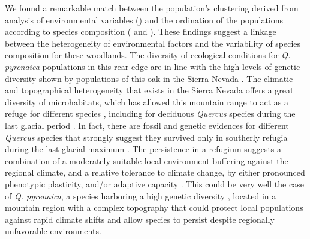 We found a remarkable match between the population's clustering derived from analysis of environmental variables () and the ordination of the populations according to species composition ( and ). These findings suggest a linkage between the heterogeneity of environmental factors and the variability of species composition for these woodlands. The diversity of ecological conditions for \emph{Q. pyrenaica} populations in this rear edge are in line with the high levels of genetic diversity shown by populations of this oak in the Sierra Nevada \autocite{ValbuenaCarabanaGil2013GeneticResilience,ValbuenaCarabanaGil2017CentenaryCoppicing}. The climatic and topographical heterogeneity that exists in the Sierra Nevada offers a great diversity of microhabitats, which has allowed this mountain range to act as a refuge for different species \autocite{MedailDiadema2009GlacialRefugia,GomezLunt2007RefugiaRefugia,BlancoPastoretal2019TopographyExplains}, including for deciduous \emph{Quercus} species during the last glacial period \autocite{Breweretal2002SpreadDeciduous,Olaldeetal2002WhiteOaks,RodriguezSanchezetal2010TreeRange}. In fact, there are fossil and genetic evidences for different \emph{Quercus} species that strongly suggest they survived only in southerly refugia during the last glacial maximum \autocite{Breweretal2002SpreadDeciduous,Petitetal2002IdentificationRefugia,BhagwatWillis2008SpeciesPersistence,BirksWillis2008AlpinesTrees}. The persistence in a refugium suggests a combination of a moderately suitable local environment buffering against the regional climate, and a relative tolerance to climate change, by either pronounced phenotypic plasticity, and/or adaptive capacity \autocite{Gavinetal2014ClimateRefugia}. This could be very well the case of \emph{Q. pyrenaica}, a species harboring a high genetic diversity \autocite{ValbuenaCarabanaGil2013GeneticResilience}, located in a mountain region with a complex topography that could protect local populations against rapid climate shifts and allow species to persist despite regionally unfavorable environments.

